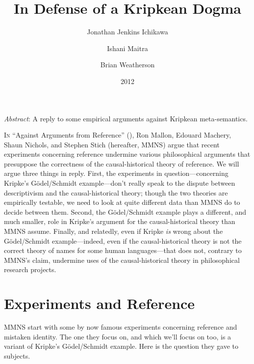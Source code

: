 \documentclass[
  11pt,
  letterpaper,
  DIV=11,
  numbers=noendperiod,
  twoside]{scrartcl}
\title{In Defense of a Kripkean Dogma}
\author{Jonathan Jenkins Ichikawa \and Ishani Maitra \and Brian
Weatherson}
\date{2012}
\renewenvironment{abstract}
 {\vspace{-1.25cm}
 \quotation\small\noindent\emph{Abstract}:}
 {\endquotation}
\renewenvironment{abstract}
 {\quotation\small\noindent\emph{Abstract}:}
 {\endquotation\vspace{-0.02cm}}
\begin{document}
\maketitle
\begin{abstract}
A reply to some empirical arguments against Kripkean meta-semantics.
\end{abstract}


\lettrine{I}{n} ``Against Arguments from Reference''
(), Ron Mallon, Edouard
Machery, Shaun Nichols, and Stephen Stich (hereafter, MMNS) argue that
recent experiments concerning reference undermine various philosophical
arguments that presuppose the correctness of the causal-historical
theory of reference. We will argue three things in reply. First, the
experiments in question---concerning Kripke's Gödel/Schmidt
example---don't really speak to the dispute between descriptivism and
the causal-historical theory; though the two theories are empirically
testable, we need to look at quite different data than MMNS do to decide
between them. Second, the Gödel/Schmidt example plays a different, and
much smaller, role in Kripke's argument for the causal-historical theory
than MMNS assume. Finally, and relatedly, even if Kripke \emph{is} wrong
about the Gödel/Schmidt example---indeed, even if the causal-historical
theory is not the correct theory of names for some human
languages---that does not, contrary to MMNS's claim, undermine uses of
the causal-historical theory in philosophical research projects.

\section{Experiments and Reference}\label{experiments-and-reference}

MMNS start with some by now famous experiments concerning reference and
mistaken identity. The one they focus on, and which we'll focus on too,
is a variant of Kripke's Gödel/Schmidt example. Here is the question
they gave to subjects.
\end{document}
